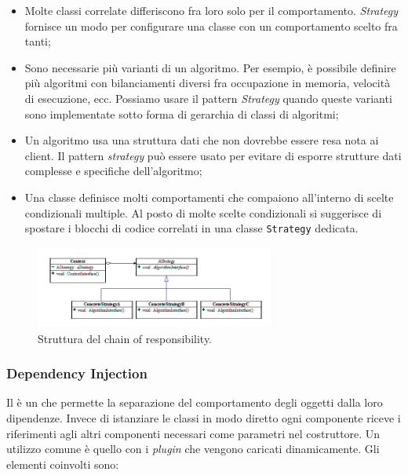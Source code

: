 \begin{itemize}

	\item Molte classi correlate differiscono fra loro solo per il comportamento. \textit{Strategy} fornisce un modo per configurare una classe con un comportamento scelto fra tanti;
	\item Sono necessarie più varianti di un algoritmo. Per esempio, è possibile definire più algoritmi con bilanciamenti diversi fra occupazione in memoria, velocità di esecuzione, ecc. Possiamo usare il pattern \textit{Strategy} quando queste varianti sono implementate sotto forma di gerarchia di classi di algoritmi;
	\item Un algoritmo usa una struttura dati che non dovrebbe essere resa nota ai client. Il pattern \textit{strategy} può essere usato per evitare di esporre strutture dati complesse e specifiche dell'algoritmo;
	\item Una classe definisce molti comportamenti che compaiono all'interno di scelte condizionali multiple. Al posto di molte scelte condizionali si suggerisce di spostare i blocchi di codice correlati in una classe \texttt{Strategy} dedicata.
	
\end{itemize}

\begin{figure}[H]
\centering \includegraphics[width=0.7\textwidth]{patterns/strategy.jpg}
\caption{Struttura del chain of responsibility.}
\label{fig:strategy}
\end{figure}
	
\subsubsection{Dependency Injection}

Il  è un  che permette la separazione del comportamento degli oggetti dalla loro dipendenze. Invece di istanziare le classi in modo diretto ogni componente riceve i riferimenti agli altri componenti necessari come parametri nel costruttore. Un utilizzo comune è quello con i 	\emph{plugin} che vengono caricati dinamicamente. Gli elementi coinvolti sono:
	
